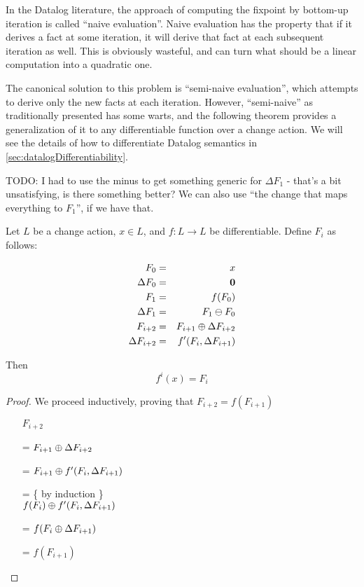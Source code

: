 In the Datalog literature, the approach of computing the fixpoint by bottom-up
iteration is called ``naive evaluation''. Naive evaluation has the property that
if it derives a fact at some iteration, it will derive that fact at each
subsequent iteration as well. This is obviously wasteful, and can turn what
should be a linear computation into a quadratic one.

The canonical solution to this problem is ``semi-naive evaluation'', which
attempts to derive only the new facts at each iteration. However, ``semi-naive''
as traditionally presented has some warts, and
the following theorem provides a generalization of it to any differentiable function over a
change action. We will see the details of how to differentiate Datalog
semantics in \cref{sec:datalogDifferentiability}.

TODO: I had to use the minus to get something generic for $\Delta F_1$ - that's
a bit unsatisfying, is there something better? We can also use ``the change that
maps everything to $F_1$'', if we have that.

\begin{thm}
\label{thm:diffIter}
  Let $L$ be a change action, $x \in L$, and $f: L \rightarrow L$ be differentiable. Define $F_i$ as follows:

  \begin{eqnarray*}
  F_0 & = & x\\
  \Delta F_0 & = & \textbf{0} \\
  F_1 & = & f(F_0)\\
  \Delta F_1 & = & F_1 \ominus F_0 \\
  F_{i+2} & = & F_{i+1} \oplus \Delta F_{i+2} \\
  \Delta F_{i+2} & = & f'(F_i, \Delta F_{i+1}) \\
  \end{eqnarray*}

  Then 
  $$f^i(x) = F_i$$
\end{thm}

\begin{proof}
We proceed inductively, proving that $F_{i+2} = f(F_{i+1})$

\begin{itemize}
\item[ ]$F_{i+2}$
\item[=]
$
F_{i+1} \oplus \Delta F_{i+2}
$
\item[=]
$
F_{i+1} \oplus f'( F_i, \Delta F_{i+1})
$
\item[=] \{ by induction \}\\
$
f(F_i) \oplus f'(F_i, \Delta F_{i+1})
$
\item[=]
$
f(F_i \oplus \Delta F_{i+1})
$ 
\item[=]
$f(F_{i+1})$
\end{itemize}
\end{proof}

